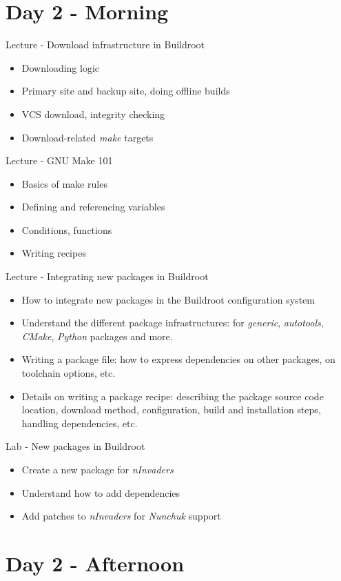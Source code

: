 \documentclass[a4paper,12pt,obeyspaces,spaces,hyphens]{article}
\begin{document}
\section{Day 2 - Morning}

\feagendatwocolumn
{Lecture - Download infrastructure in Buildroot}
{
  \begin{itemize}
  \item Downloading logic
  \item Primary site and backup site, doing offline builds
  \item VCS download, integrity checking
  \item Download-related {\em make} targets
  \end{itemize}
}
{Lecture - GNU Make 101}
{
  \begin{itemize}
  \item Basics of make rules
  \item Defining and referencing variables
  \item Conditions, functions
  \item Writing recipes
  \end{itemize}
}

\feagendatwocolumn
{Lecture - Integrating new packages in Buildroot}
{
  \begin{itemize}
  \item How to integrate new packages in the Buildroot configuration
    system
  \item Understand the different package infrastructures: for {\em
      generic}, {\em autotools}, {\em CMake}, {\em Python} packages
    and more.
  \item Writing a package  file: how to express
    dependencies on other packages, on toolchain options, etc.
  \item Details on writing a package recipe: describing the package
    source code location, download method, configuration, build and
    installation steps, handling dependencies, etc.
  \end{itemize}
}
{Lab - New packages in Buildroot}
{
  \begin{itemize}
  \item Create a new package for {\em nInvaders}
  \item Understand how to add dependencies
  \item Add patches to {\em nInvaders} for {\em Nunchuk} support
  \end{itemize}
}

\section{Day 2 - Afternoon}
\end{document}

